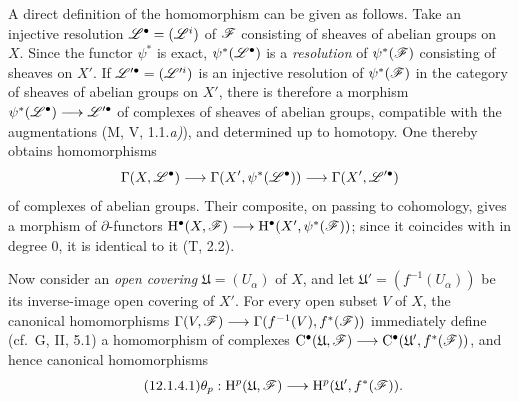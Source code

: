 \begin{env}[12.1.4]
\label{0.12.1.4}
A direct definition of the homomorphism  can be
given as follows.
Take an injective resolution
$\mathscr{L}^\bullet=(\mathscr{L}^i)$ of $\mathscr{F}$ consisting of sheaves of
abelian groups on $X$.
Since the functor $\psi^*$ is exact,
$\psi^*(\mathscr{L}^\bullet)$ is a \emph{resolution} of $\psi^*(\mathscr{F})$
consisting of sheaves on $X'$.
If $\mathscr{L}'^\bullet=(\mathscr{L}'^i)$ is an injective resolution of
$\psi^*(\mathscr{F})$ in the category of sheaves of abelian groups on
$X'$, there is therefore a morphism $\psi^*(\mathscr{L}^\bullet)\longrightarrow\mathscr{L}'^\bullet$
of complexes of sheaves of abelian groups, compatible with the
augmentations (M, V, 1.1.\emph{a)}), and determined up to homotopy.
One thereby obtains homomorphisms
\[
  \Gamma(X,\mathscr{L}^\bullet)
  \longrightarrow
  \Gamma(X',\psi^*(\mathscr{L}^\bullet))
  \longrightarrow
  \Gamma(X',\mathscr{L}'^\bullet)
\]
of complexes of abelian groups.
Their composite, on passing to cohomology, gives a morphism of
$\partial$-functors $\mathrm{H}^\bullet(X,\mathscr{F})
\longrightarrow
\mathrm{H}^\bullet(X',\psi^*(\mathscr{F}))$;
since it coincides with  in degree $0$, it is
identical to it (T, 2.2).

Now consider an \emph{open covering}
$\mathfrak{U}=(U_\alpha)$ of $X$, and let
$\mathfrak{U}'=(f^{-1}(U_\alpha))$ be its inverse-image open covering
of $X'$.
For every open subset $V$ of $X$, the canonical homomorphisms $\Gamma(V,\mathscr{F})
\longrightarrow
\Gamma(f^{-1}(V),f^*(\mathscr{F}))$
immediately define (cf.\ G, II, 5.1) a homomorphism of complexes $\mathrm{C}^\bullet(\mathfrak{U},\mathscr{F})
\longrightarrow
\mathrm{C}^\bullet(\mathfrak{U}',f^*(\mathscr{F}))$,
and hence canonical homomorphisms
\[
\label{0.12.1.4.1}
\tag{12.1.4.1}
  \theta_p:
  \mathrm{H}^p(\mathfrak{U},\mathscr{F})
  \longrightarrow
  \mathrm{H}^p(\mathfrak{U}',f^*(\mathscr{F})).
\]


\end{env}

